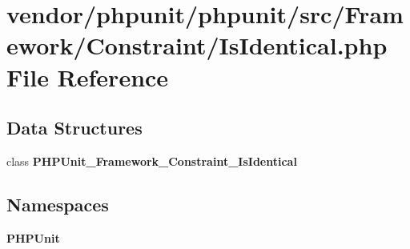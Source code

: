 \section{vendor/phpunit/phpunit/src/\+Framework/\+Constraint/\+Is\+Identical.php File Reference}
\label{_is_identical_8php}
\subsection*{Data Structures}
\begin{DoxyCompactItemize}
\item 
class {\bf P\+H\+P\+Unit\+\_\+\+Framework\+\_\+\+Constraint\+\_\+\+Is\+Identical}
\end{DoxyCompactItemize}
\subsection*{Namespaces}
\begin{DoxyCompactItemize}
\item 
 {\bf P\+H\+P\+Unit}
\end{DoxyCompactItemize}
